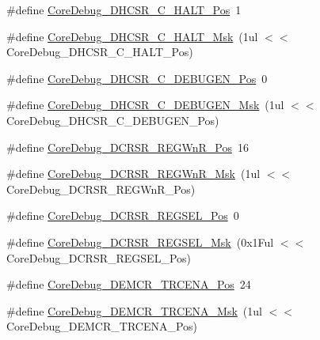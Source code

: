 \begin{DoxyCompactItemize}
\item 
\#define \mbox{\hyperlink{group___c_m_s_i_s___c_m3___core_debug_gaddf1d43f8857e4efc3dc4e6b15509692}{Core\+Debug\+\_\+\+D\+H\+C\+S\+R\+\_\+\+C\+\_\+\+H\+A\+L\+T\+\_\+\+Pos}}~1
\item 
\#define \mbox{\hyperlink{group___c_m_s_i_s___c_m3___core_debug_ga1d905a3aa594eb2e8bb78bcc4da05b3f}{Core\+Debug\+\_\+\+D\+H\+C\+S\+R\+\_\+\+C\+\_\+\+H\+A\+L\+T\+\_\+\+Msk}}~(1ul $<$$<$ Core\+Debug\+\_\+\+D\+H\+C\+S\+R\+\_\+\+C\+\_\+\+H\+A\+L\+T\+\_\+\+Pos)
\item 
\#define \mbox{\hyperlink{group___c_m_s_i_s___c_m3___core_debug_gab557abb5b172b74d2cf44efb9d824e4e}{Core\+Debug\+\_\+\+D\+H\+C\+S\+R\+\_\+\+C\+\_\+\+D\+E\+B\+U\+G\+E\+N\+\_\+\+Pos}}~0
\item 
\#define \mbox{\hyperlink{group___c_m_s_i_s___c_m3___core_debug_gab815c741a4fc2a61988cd2fb7594210b}{Core\+Debug\+\_\+\+D\+H\+C\+S\+R\+\_\+\+C\+\_\+\+D\+E\+B\+U\+G\+E\+N\+\_\+\+Msk}}~(1ul $<$$<$ Core\+Debug\+\_\+\+D\+H\+C\+S\+R\+\_\+\+C\+\_\+\+D\+E\+B\+U\+G\+E\+N\+\_\+\+Pos)
\item 
\#define \mbox{\hyperlink{group___c_m_s_i_s___c_m3___core_debug_ga51e75942fc0614bc9bb2c0e96fcdda9a}{Core\+Debug\+\_\+\+D\+C\+R\+S\+R\+\_\+\+R\+E\+G\+Wn\+R\+\_\+\+Pos}}~16
\item 
\#define \mbox{\hyperlink{group___c_m_s_i_s___c_m3___core_debug_ga1eef4992d8f84bc6c0dffed1c87f90a5}{Core\+Debug\+\_\+\+D\+C\+R\+S\+R\+\_\+\+R\+E\+G\+Wn\+R\+\_\+\+Msk}}~(1ul $<$$<$ Core\+Debug\+\_\+\+D\+C\+R\+S\+R\+\_\+\+R\+E\+G\+Wn\+R\+\_\+\+Pos)
\item 
\#define \mbox{\hyperlink{group___c_m_s_i_s___c_m3___core_debug_ga52182c8a9f63a52470244c0bc2064f7b}{Core\+Debug\+\_\+\+D\+C\+R\+S\+R\+\_\+\+R\+E\+G\+S\+E\+L\+\_\+\+Pos}}~0
\item 
\#define \mbox{\hyperlink{group___c_m_s_i_s___c_m3___core_debug_ga17cafbd72b55030219ce5609baa7c01d}{Core\+Debug\+\_\+\+D\+C\+R\+S\+R\+\_\+\+R\+E\+G\+S\+E\+L\+\_\+\+Msk}}~(0x1\+Ful $<$$<$ Core\+Debug\+\_\+\+D\+C\+R\+S\+R\+\_\+\+R\+E\+G\+S\+E\+L\+\_\+\+Pos)
\item 
\#define \mbox{\hyperlink{group___c_m_s_i_s___c_m3___core_debug_ga6ff2102b98f86540224819a1b767ba39}{Core\+Debug\+\_\+\+D\+E\+M\+C\+R\+\_\+\+T\+R\+C\+E\+N\+A\+\_\+\+Pos}}~24
\item 
\#define \mbox{\hyperlink{group___c_m_s_i_s___c_m3___core_debug_ga5e99652c1df93b441257389f49407834}{Core\+Debug\+\_\+\+D\+E\+M\+C\+R\+\_\+\+T\+R\+C\+E\+N\+A\+\_\+\+Msk}}~(1ul $<$$<$ Core\+Debug\+\_\+\+D\+E\+M\+C\+R\+\_\+\+T\+R\+C\+E\+N\+A\+\_\+\+Pos)
$$
\end{DoxyCompactItemize}
